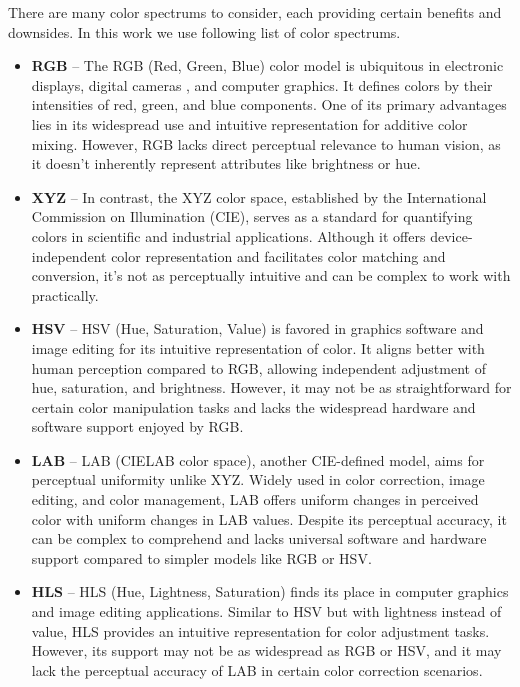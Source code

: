 There are many color spectrums to consider, each providing certain benefits and downsides. In this work we use
following list of color spectrums.
\begin{itemize}
  \item \textbf{RGB} -- The RGB (Red, Green, Blue) color model is ubiquitous in electronic displays, digital cameras
  , and computer graphics. It defines colors by their intensities of red, green, and blue components. One of its primary advantages lies in its widespread use and intuitive representation for additive color mixing. However, RGB lacks direct perceptual relevance to human vision, as it doesn't inherently represent attributes like brightness or hue.
  \item \textbf{XYZ} -- In contrast, the XYZ color space, established by the International Commission on Illumination
  (CIE), serves as a standard for quantifying colors in scientific and industrial applications. Although it offers device-independent color representation and facilitates color matching and conversion, it's not as perceptually intuitive and can be complex to work with practically.
  \item \textbf{HSV} -- HSV (Hue, Saturation, Value) is favored in graphics software and image editing for its
  intuitive representation of color. It aligns better with human perception compared to RGB, allowing independent adjustment of hue, saturation, and brightness. However, it may not be as straightforward for certain color manipulation tasks and lacks the widespread hardware and software support enjoyed by RGB.
  \item \textbf{LAB} -- LAB (CIELAB color space), another CIE-defined model, aims for perceptual uniformity unlike
  XYZ. Widely used in color correction, image editing, and color management, LAB offers uniform changes in perceived color with uniform changes in LAB values. Despite its perceptual accuracy, it can be complex to comprehend and lacks universal software and hardware support compared to simpler models like RGB or HSV.
  \item \textbf{HLS} --  HLS (Hue, Lightness, Saturation) finds its place in computer graphics and image editing
  applications. Similar to HSV but with lightness instead of value, HLS provides an intuitive representation for color adjustment tasks. However, its support may not be as widespread as RGB or HSV, and it may lack the perceptual accuracy of LAB in certain color correction scenarios.
\end{itemize}


